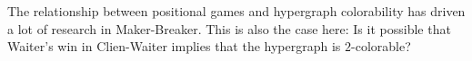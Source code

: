 \documentclass{article}
\begin{document}
The relationship between positional games and hypergraph colorability has driven a lot of research in Maker-Breaker. This is also the case here: 
Is it possible that Waiter's win in Clien-Waiter implies that the hypergraph is \(2\)-colorable?



 
 
\end{document}
